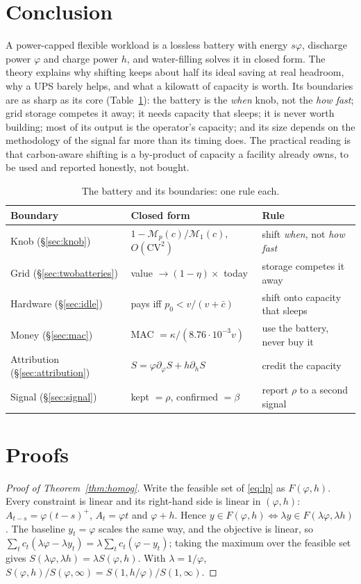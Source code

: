 \documentclass[acmsmall,review,anonymous]{acmart}
\theoremstyle{definition}
\newcommand{\Mp}{\mathcal{M}}
\begin{document}
\section{Conclusion}
\label{sec:conclusion}
A power-capped flexible workload is a lossless battery with energy $s\varphi$, discharge power
$\varphi$ and charge power $h$, and water-filling solves it in closed form. The theory explains
why shifting keeps about half its ideal saving at real headroom, why a UPS barely helps, and
what a kilowatt of capacity is worth. Its boundaries are as sharp as its core
(Table~\ref{tab:boundaries}): the battery is the \emph{when} knob, not the \emph{how fast}; grid
storage competes it away; it needs capacity that sleeps; it is never worth building; most of
its output is the operator's capacity; and its size depends on the methodology of the signal
far more than its timing does. The practical reading is that carbon-aware shifting is a
by-product of capacity a facility already owns, to be used and reported honestly, not bought.
\begin{table}[t]
\caption{The battery and its boundaries: one rule each.}
\label{tab:boundaries}
\small
\begin{tabular}{@{}lll@{}}
\toprule
Boundary & Closed form & Rule \\
\midrule
Knob (\S\ref{sec:knob}) & $1-\Mp_p(c)/\Mp_1(c)$, $O(\mathrm{CV}^2)$ & shift \emph{when}, not \emph{how fast} \\
Grid (\S\ref{sec:twobatteries}) & value $\to(1-\eta)\times$ today & storage competes it away \\
Hardware (\S\ref{sec:idle}) & pays iff $p_0<v/(v+\bar c)$ & shift onto capacity that sleeps \\
Money (\S\ref{sec:mac}) & MAC $=\kappa/(8.76\cdot10^{-3}v)$ & use the battery, never buy it \\
Attribution (\S\ref{sec:attribution}) & $S=\varphi\partial_\varphi S+h\partial_hS$ & credit the capacity \\
Signal (\S\ref{sec:signal}) & kept $=\rho$, confirmed $=\beta$ & report $\rho$ to a second signal \\
\bottomrule
\end{tabular}
\end{table}

\appendix
\section{Proofs}

\begin{proof}[Proof of Theorem~\ref{thm:homog}]
Write the feasible set of \eqref{eq:lp} as $F(\varphi,h)$. Every constraint is linear and its
right-hand side is linear in $(\varphi,h)$: $A_{t-s}=\varphi(t-s)^+$, $A_t=\varphi t$ and
$\varphi+h$. Hence $y\in F(\varphi,h)\iff\lambda y\in F(\lambda\varphi,\lambda h)$. The baseline
$y_t=\varphi$ scales the same way, and the objective is linear, so
$\sum_t c_t(\lambda\varphi-\lambda y_t)=\lambda\sum_t c_t(\varphi-y_t)$; taking the maximum over
the feasible set gives $S(\lambda\varphi,\lambda h)=\lambda S(\varphi,h)$. With
$\lambda=1/\varphi$, $S(\varphi,h)/S(\varphi,\infty)=S(1,h/\varphi)/S(1,\infty)$.
\end{proof}
\end{document}
